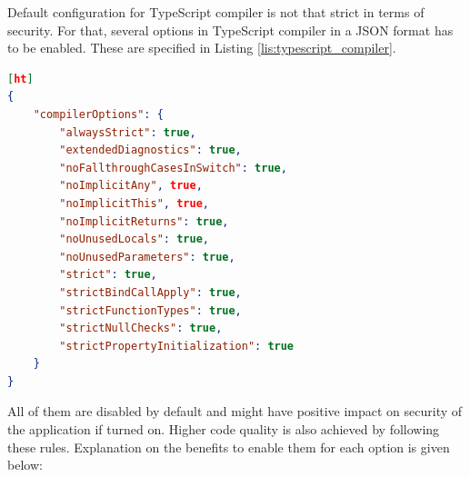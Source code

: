 \documentclass{article} %
\begin{document}
\newline
Default configuration for TypeScript compiler is not that strict in terms of security. For that, several options in TypeScript compiler in a JSON format has to be enabled. These are specified in Listing \ref{lis:typescript_compiler}.\\
\newline
\begin{lstlisting}[language=json,firstnumber=1,label={lis:typescript_compiler},caption={TypeScript's compiler custom stricter rules.}][ht]
{
    "compilerOptions": {
        "alwaysStrict": true,
        "extendedDiagnostics": true,
        "noFallthroughCasesInSwitch": true,
        "noImplicitAny", true,
        "noImplicitThis", true,
        "noImplicitReturns": true,
        "noUnusedLocals": true,
        "noUnusedParameters": true,
        "strict": true,
        "strictBindCallApply": true,
        "strictFunctionTypes": true,
        "strictNullChecks": true,
        "strictPropertyInitialization": true
    }
}
\end{lstlisting}
All of them are disabled by default \cite{bib:typescript_compiler_settings} and might have positive impact on security of the application if turned on. Higher code quality is also achieved by following these rules. Explanation on the benefits to enable them for each option is given below:
\end{document}
